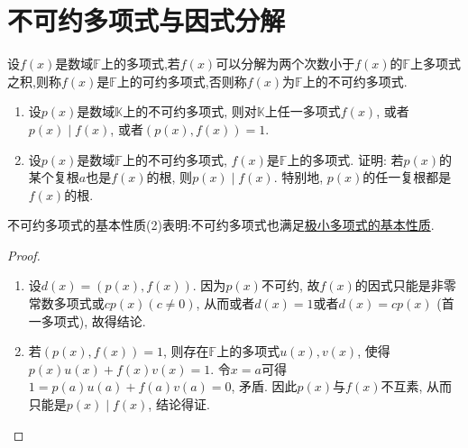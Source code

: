 \documentclass[../../main.tex]{subfiles}%
\begin{document}
\section{不可约多项式与因式分解}

\begin{definition}[不可约多项式的定义]\label{definition:不可约多项式的定义}
设\(f(x)\)是数域\(\mathbb{F}\)上的多项式,若\(f(x)\)可以分解为两个次数小于\(f(x)\)的\(\mathbb{F}\)上多项式之积,则称\(f(x)\)是\(\mathbb{F}\)上的可约多项式,否则称\(f(x)\)为\(\mathbb{F}\)上的不可约多项式.
\end{definition}

\begin{proposition}[不可约多项式的基本性质]\label{proposition:不可约多项式的基本性质}
\begin{enumerate}[(1)]
\item 设\(p(x)\)是数域\(\mathbb{K}\)上的不可约多项式, 则对\(\mathbb{K}\)上任一多项式\(f(x)\), 或者\(p(x)\mid f(x)\), 或者\((p(x),f(x)) = 1\).

\item 设\(p(x)\)是数域\(\mathbb{F}\)上的不可约多项式, \(f(x)\)是\(\mathbb{F}\)上的多项式. 证明: 若\(p(x)\)的某个复根\(a\)也是\(f(x)\)的根, 则\(p(x)\mid f(x)\). 特别地, \(p(x)\)的任一复根都是\(f(x)\)的根.
\end{enumerate}
\end{proposition}
\begin{note}
不可约多项式的基本性质(2)表明:不可约多项式也满足\hyperref[proposition:极小多项式的基本性质]{极小多项式的基本性质}.
\end{note}
\begin{proof}
\begin{enumerate}[(1)]
\item 设\(d(x)=(p(x),f(x))\). 因为\(p(x)\)不可约, 故\(f(x)\)的因式只能是非零常数多项式或\(cp(x)(c\neq 0)\), 从而或者\(d(x)=1\)或者\(d(x)=cp(x)\) (首一多项式), 故得结论.

\item 若\((p(x),f(x)) = 1\), 则存在\(\mathbb{F}\)上的多项式\(u(x),v(x)\), 使得\(p(x)u(x)+f(x)v(x)=1\). 令\(x = a\)可得\(1 = p(a)u(a)+f(a)v(a)=0\), 矛盾. 因此\(p(x)\)与\(f(x)\)不互素, 从而只能是\(p(x)\mid f(x)\), 结论得证. 
\end{enumerate}


\end{proof}
\end{document}
